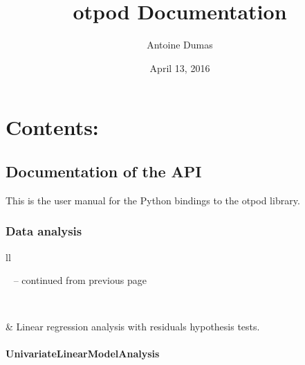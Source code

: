 \documentclass[letterpaper,10pt,english]{sphinxmanual}
\title{otpod Documentation}
\date{April 13, 2016}
\author{Antoine Dumas}
\begin{document}
\maketitle
\tableofcontents
{}\label{index::doc}



\chapter{Contents:}
\label{index:welcome-to-otpod-s-documentation}\label{index:contents}

\section{Documentation of the API}
\label{user_manual::doc}\label{user_manual:documentation-of-the-api}
This is the user manual for the Python bindings to the otpod library.


\subsection{Data analysis}
\label{user_manual:data-analysis}
\begin{longtable}{ll}
\hline
\endfirsthead

%
{{\textsf{\tablename\ \thetable{} -- continued from previous page}}} \\
\hline
\endhead

\hline {} \\ \hline
\endfoot

\endlastfoot


{\hyperref[_generated/otpod.UnivariateLinearModelAnalysis:otpod.UnivariateLinearModelAnalysis]{\emph{}}}
 & 
Linear regression analysis with residuals hypothesis tests.
\\
\hline\end{longtable}



\subsubsection{UnivariateLinearModelAnalysis}
\label{_generated/otpod.UnivariateLinearModelAnalysis:univariatelinearmodelanalysis}\label{_generated/otpod.UnivariateLinearModelAnalysis::doc}
\end{document}
